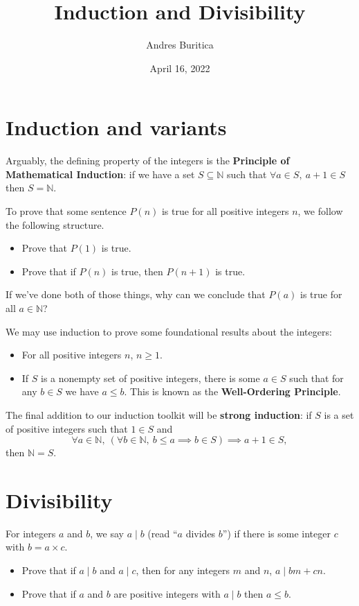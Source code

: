 \documentclass{article}
\title{Induction and Divisibility}
\author{Andres Buritica}
\date{April 16, 2022}
\begin{document}
\maketitle
\section{Induction and variants}
  Arguably, the defining property of the integers is the \textbf{Principle of
    Mathematical Induction}: if we have a set $S\subseteq\mathbb N$ such that
    $\forall a\in S,\ a+1\in S$ then $S=\mathbb N$.
  
  To prove that some sentence $P(n)$ is true for all positive integers $n$, we
  follow the following structure.
  \begin{itemize}
    \item Prove that $P(1)$ is true.
    \item Prove that if $P(n)$ is true, then $P(n+1)$ is true.
  \end{itemize}
  If we've done both of those things, why can we conclude that $P(a)$ is true
  for all $a\in\mathbb N$?

  We may use induction to prove some foundational results about the integers:
  \begin{itemize}
    \item For all positive integers $n$, $n\ge 1$.
    \item If $S$ is a nonempty set of positive integers, there is some $a\in
      S$ such that for any $b\in S$ we have $a\le b$.
      This is known as the \textbf{Well-Ordering Principle}.
  \end{itemize}

  The final addition to our induction toolkit will be \textbf{strong induction}:
  if $S$ is a set of positive integers such that $1\in S$ and
      \[\forall a\in \mathbb N,\ (\forall b\in\mathbb N,\ b\le a\implies b\in
        S)\implies a+1\in S,\]
        then $\mathbb N=S$.
\section{Divisibility}
  For integers $a$ and $b$, we say $a\mid b$ (read ``$a$ divides
  $b$'') if there is some integer $c$ with $b=a\times c$.
  \begin{itemize}
    \item Prove that if $a\mid b$ and $a\mid c$, then for any integers $m$ and
      $n$, $a\mid bm+cn$.
    \item Prove that if $a$ and $b$ are positive integers with $a\mid b$ then
      $a\le b$.
  \end{itemize}
\end{document}
